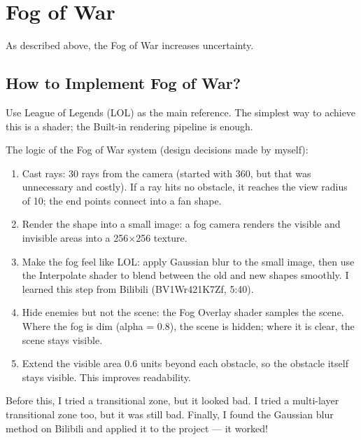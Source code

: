\section{Fog of War}

As described above, the Fog of War increases uncertainty.

\subsection{How to Implement Fog of War?}

Use League of Legends (LOL) as the main reference. The simplest way to achieve this is a shader; the Built-in rendering pipeline is enough.

The logic of the Fog of War system (design decisions made by myself):

\begin{enumerate}
  \item Cast rays: 30 rays from the camera (started with 360, but that was unnecessary and costly). If a ray hits no obstacle, it reaches the view radius of 10; the end points connect into a fan shape.
  \item Render the shape into a small image: a fog camera renders the visible and invisible areas into a 256$\times$256 texture.
  \item Make the fog feel like LOL: apply Gaussian blur to the small image, then use the Interpolate shader to blend between the old and new shapes smoothly. I learned this step from Bilibili (BV1Wr421K7Zf, 5:40).
  \item Hide enemies but not the scene: the Fog Overlay shader samples the scene. Where the fog is dim (alpha = 0.8), the scene is hidden; where it is clear, the scene stays visible.
  \item Extend the visible area 0.6 units beyond each obstacle, so the obstacle itself stays visible. This improves readability.
\end{enumerate}

Before this, I tried a transitional zone, but it looked bad. I tried a multi-layer transitional zone too, but it was still bad. Finally, I found the Gaussian blur method on Bilibili and applied it to the project --- it worked!

